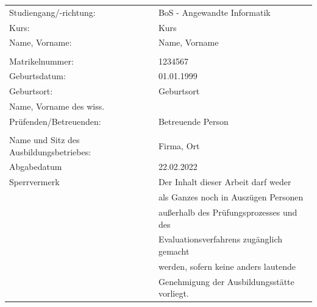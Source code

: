 \begin{titlepage}
\begin{tabular}{ll}
         Studiengang/-richtung:       	& BoS - Angewandte Informatik   \\
         Kurs:                 			& Kurs    						\\
         Name, Vorname:                 & Name, Vorname          	 	\\
        \\
         Matrikelnummer:        		& 1234567        				\\
         Geburtsdatum:      			& 01.01.1999        			\\
         Geburtsort:					& Geburtsort					\\
         Name, Vorname des wiss.\\ Prüfenden/Betreuenden: & Betreuende Person \\
        \\
         Name und Sitz des Ausbildungsbetriebes:	& Firma, Ort		\\
         Abgabedatum		& 22.02.2022		\\
        Sperrvermerk		& Der Inhalt dieser Arbeit darf weder \\
         & als Ganzes noch in Auszügen Personen\\
         & außerhalb des Prüfungsprozesses und des\\
         & Evaluationsverfahrens zugänglich gemacht\\
         & werden, sofern keine anders lautende\\
         & Genehmigung der Ausbildungsstätte vorliegt.  \\
    \end{tabular}


\vspace{49.7pt}


\end{titlepage}
